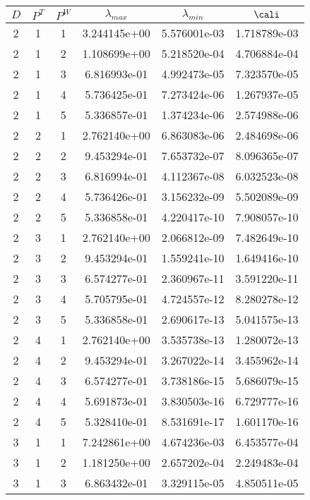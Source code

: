 \documentclass{article}
\begin{document}
{\begin{small}
\begin{table}
\begin{center}
\begin{tabular}{|ccc|ccc|} \hline
 $D$ & $P^T$  & $P^W$  & $\lambda_{max}$ & $\lambda_{min}$   & $\cali$  \\
   \hline
2 & 1 & 1 &  3.244145e+00 & 5.576001e-03 & 1.718789e-03 \\ 
2 & 1 & 2 &  1.108699e+00 & 5.218520e-04 & 4.706884e-04 \\ 
2 & 1 & 3 &  6.816993e-01 & 4.992473e-05 & 7.323570e-05 \\ 
2 & 1 & 4 &  5.736425e-01 & 7.273424e-06 & 1.267937e-05 \\ 
2 & 1 & 5 &  5.336857e-01 & 1.374234e-06 & 2.574988e-06 \\ 
2 & 2 & 1 &  2.762140e+00 & 6.863083e-06 & 2.484698e-06 \\ 
2 & 2 & 2 &  9.453294e-01 & 7.653732e-07 & 8.096365e-07 \\ 
2 & 2 & 3 &  6.816994e-01 & 4.112367e-08 & 6.032523e-08 \\ 
2 & 2 & 4 &  5.736426e-01 & 3.156232e-09 & 5.502089e-09 \\ 
2 & 2 & 5 &  5.336858e-01 & 4.220417e-10 & 7.908057e-10 \\ 
2 & 3 & 1 &  2.762140e+00 & 2.066812e-09 & 7.482649e-10 \\ 
2 & 3 & 2 &  9.453294e-01 & 1.559241e-10 & 1.649416e-10 \\ 
2 & 3 & 3 &  6.574277e-01 & 2.360967e-11 & 3.591220e-11 \\ 
2 & 3 & 4 &  5.705795e-01 & 4.724557e-12 & 8.280278e-12 \\ 
2 & 3 & 5 &  5.336858e-01 & 2.690617e-13 & 5.041575e-13 \\ 
2 & 4 & 1 &  2.762140e+00 & 3.535738e-13 & 1.280072e-13 \\ 
2 & 4 & 2 &  9.453294e-01 & 3.267022e-14 & 3.455962e-14 \\ 
2 & 4 & 3 &  6.574277e-01 & 3.738186e-15 & 5.686079e-15 \\ 
2 & 4 & 4 &  5.691873e-01 & 3.830503e-16 & 6.729777e-16 \\ 
2 & 4 & 5 &  5.328410e-01 & 8.531691e-17 & 1.601170e-16 \\
\hline
3 & 1 & 1 &  7.242861e+00 & 4.674236e-03 & 6.453577e-04 \\ 
3 & 1 & 2 &  1.181250e+00 & 2.657202e-04 & 2.249483e-04 \\ 
3 & 1 & 3 &  6.863432e-01 & 3.329115e-05 & 4.850511e-05 \\ 

\end{tabular}
\end{center}
\end{table}
\end{small}}
\end{document}
